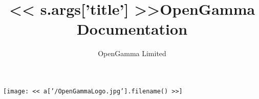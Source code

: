 \documentclass[a4paper]{amsart}
\title{<< s.args['title'] >>}
\title{OpenGamma Documentation}
\author{OpenGamma Limited}
\begin{document}
\maketitle%

\begin{center}
\texttt{[image: << a['/OpenGammaLogo.jpg'].filename() >>]}
\hspace{1cm}
\end{center}

\end{document}
